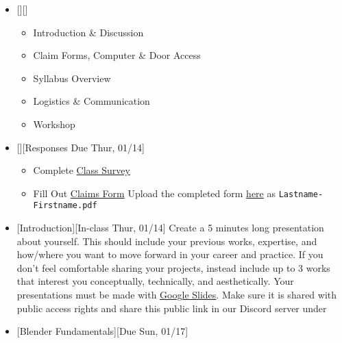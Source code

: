 \def\dMon{Mon, 01/11}
\def\dTues{Tues, 01/12}
\def\dWed{Wed, 01/13}
\def\dThur{Thur, 01/14}
\def\dFri{Fri, 01/15}
\def\dSat{Sat, 01/16}
\def\dSun{Sun, 01/17}
\placeDate

\begin{itemize}[noitemsep,topsep=0pt,leftmargin=*]
      \item {}[][]
            \begin{itemize}
                  \item Introduction \& Discussion
                  \item Claim Forms, Computer \& Door Access
                  \item Syllabus Overview
                  \item Logistics \& Communication
                  \item Workshop
            \end{itemize}
      \item {}[][Responses Due \dThur]
            \begin{itemize}
                  \item Complete \href{https://forms.gle/MnFLmcqK7PUiKwra7}{Class Survey}
                  \item Fill Out \href{https://drive.google.com/file/d/1SeksTmFmQa6uehrmoSIL_uO8tuORo0P3/view}{Claims Form}
                        \newline Upload the completed form \href{https://osu.app.box.com/f/eb897914f2e94a08aace11a93668c046}{here} as \texttt{Lastname-Firstname.pdf}
            \end{itemize}
      \item {}[Introduction][In-class \dThur] \newline Create a 5 minutes long presentation about yourself. This should include your previous works, expertise, and how/where you want to move forward in your career and practice. If you don't feel comfortable sharing your projects, instead include up to 3 works that interest you conceptually, technically, and aesthetically. Your presentations must be made with \href{https://docs.google.com/presentation/}{Google Slides}. Make sure it is shared with public access rights and share this public link in our Discord server under 
      \item {}[Blender Fundamentals][Due \dSun]

\end{itemize}
